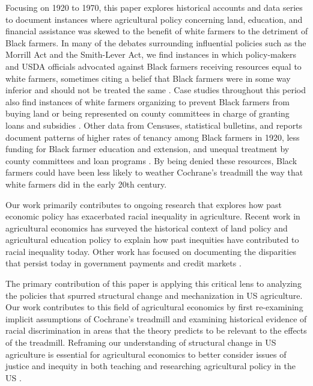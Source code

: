 \documentclass[12pt]{article}
\begin{document}
Focusing on 1920 to 1970, this paper explores historical accounts and data series to document instances where agricultural policy concerning land, education, and financial assistance was skewed to the benefit of white farmers to the detriment of Black farmers. 
In many of the debates surrounding influential policies such as the Morrill Act and the Smith-Lever Act, we find instances in which policy-makers and USDA officials advocated against Black farmers receiving resources equal to white farmers, sometimes citing a belief that Black farmers were in some way inferior and should not be treated the same \citep{harris_extension_2008,rose_race_2022,davis_negro_1933,poe_south-wide_1913}.
Case studies throughout this period also find instances of white farmers organizing to prevent Black farmers from buying land or being represented on county committees in charge of granting loans and subsidies \citep{daniel_dispossession_2013,irons_reconstituting_2010,black_economic_research_center_center_only_1973}.
Other data from Censuses, statistical bulletins, and reports document patterns of higher rates of tenancy among Black farmers in 1920, less funding for Black farmer education and extension, and unequal treatment by county committees and loan programs \citep{wilkerson_agricultural_1942,us_commission_on_civil_rights_equal_1965,reynolds_black_2002}.
By being denied these resources, Black farmers could have been less likely to weather Cochrane’s treadmill the way that white farmers did in the early 20th century. 

Our work primarily contributes to ongoing research that explores how past economic policy has exacerbated racial inequality in agriculture. 
Recent work in agricultural economics has surveyed the historical context of land policy \citep{muhammad_african_2024,darity_jr_reconsidering_2023,francis_black_2022} and agricultural education policy \citep{grant_overview_2024,wilson_distribution_2024} to explain how past inequities have contributed to racial inequality today.
Other work has focused on documenting the disparities that persist today in government payments \citep{giri_analysis_2022,hendricks_explaining_2023,yu_understanding_2024} and credit markets \citep{mishra_racial_2024,vekemans_loan_2024,mcdonald_role_2022,ahrendsen_beginning_2022}. 

The primary contribution of this paper is applying this critical lens to analyzing the policies that spurred structural change and mechanization in US agriculture. 
Our work contributes to this field of agricultural economics by first re-examining implicit assumptions of Cochrane's treadmill and examining historical evidence of racial discrimination in areas that the theory predicts to be relevant to the effects of the treadmill. 
Reframing our understanding of structural change in US agriculture is essential for agricultural economics to better consider issues of justice and inequity in both teaching and researching agricultural policy in the US \citep{wilson_call_2023,darity_jr_reconsidering_2023}. 
\end{document}
